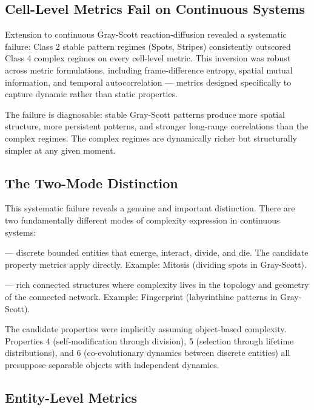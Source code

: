 \documentclass[12pt,a4paper]{article}
\begin{document}
\subsection{Cell-Level Metrics Fail on Continuous Systems}

Extension to continuous Gray-Scott reaction-diffusion \citep{gray1984}
revealed a systematic failure: Class 2 stable pattern regimes (Spots,
Stripes) consistently outscored Class 4 complex regimes on every
cell-level metric.
This inversion was robust across metric formulations, including
frame-difference entropy, spatial mutual information, and temporal
autocorrelation — metrics designed specifically to capture dynamic
rather than static properties.

The failure is diagnosable: stable Gray-Scott patterns produce more
spatial structure, more persistent patterns, and stronger long-range
correlations than the complex regimes.
The complex regimes are dynamically richer but structurally simpler at
any given moment.

\subsection{The Two-Mode Distinction}

This systematic failure reveals a genuine and important distinction.
There are two fundamentally different modes of complexity expression
in continuous systems:

\begin{description}[noitemsep, leftmargin=1.5em]
  \item[Object-based complexity] — discrete bounded entities that
    emerge, interact, divide, and die. The candidate property metrics apply
    directly. Example: Mitosis (dividing spots in Gray-Scott).
  \item[Morphological complexity] — rich connected structures where
    complexity lives in the topology and geometry of the connected
    network. Example: Fingerprint (labyrinthine patterns in Gray-Scott).
\end{description}

The candidate properties were implicitly assuming object-based complexity.
Properties 4 (self-modification through division), 5 (selection through
lifetime distributions), and 6 (co-evolutionary dynamics between
discrete entities) all presuppose separable objects with independent
dynamics.

\subsection{Entity-Level Metrics}
\end{document}

